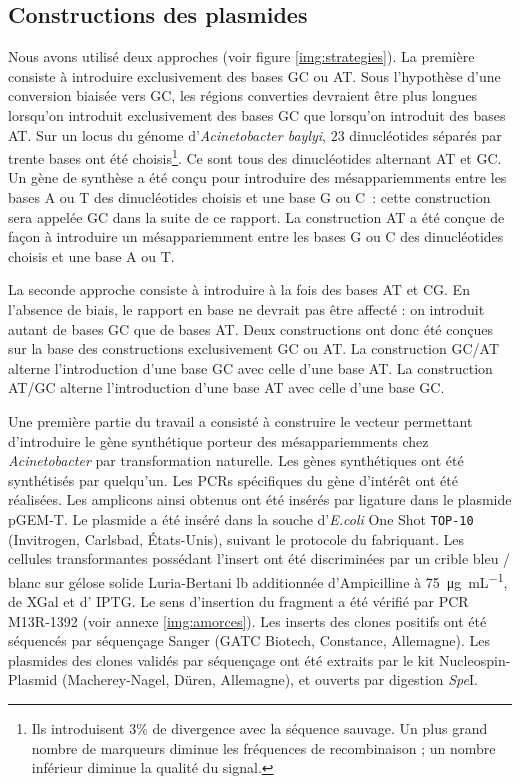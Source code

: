 \subsection{Constructions des plasmides}
\label{subsec:constructions}

Nous avons utilisé deux approches (voir figure \ref{img:strategies}). La
première consiste à introduire exclusivement des bases GC ou AT. Sous
l'hypothèse d'une conversion biaisée vers GC, les régions converties devraient
être plus longues lorsqu'on introduit exclusivement des bases GC que lorsqu'on
introduit des bases AT. Sur un locus du génome d'\emph{Acinetobacter baylyi},
$23$ dinucléotides séparés par trente bases ont été choisis\footnote{Ils
  introduisent 3\% de divergence avec la séquence sauvage. Un plus grand nombre
  de marqueurs diminue les fréquences de recombinaison ; un nombre inférieur
  diminue la qualité du signal.}. Ce sont tous des dinucléotides alternant AT et
GC. Un gène de synthèse a été conçu pour introduire des mésappariemments entre
les bases A ou T des dinucléotides choisis et une base G ou C~: cette
construction sera appelée GC dans la suite de ce rapport. La construction AT a
été conçue de façon à introduire un mésappariemment entre les bases G ou C des
dinucléotides choisis et une base A ou T.


La seconde approche consiste à introduire à la fois des bases AT et CG. En
l'absence de biais, le rapport en base ne devrait pas être affecté : on
introduit autant de bases GC que de bases AT. Deux constructions ont donc été
conçues sur la base des constructions exclusivement GC ou AT. La construction
GC/AT alterne l'introduction d'une base GC avec celle d'une base AT. La
construction AT/GC alterne l'introduction d'une base AT avec celle d'une base
GC.

Une première partie du travail a consisté à construire le vecteur permettant
d'introduire le gène synthétique porteur des mésappariemments chez
\emph{Acinetobacter} par transformation naturelle. Les gènes synthétiques ont
été synthétisés par quelqu'un.
Les PCRs spécifiques du gène d'intérêt ont été réalisées. Les amplicons ainsi
obtenus ont été insérés par ligature dans le plasmide pGEM-T. Le plasmide a été
inséré dans la souche d'\textit{E.coli} One
Shot\textsuperscript{{\textregistered}} \texttt{TOP-10} (Invitrogen, Carlsbad,
États-Unis), suivant le protocole du fabriquant. Les cellules transformantes
possédant l'insert ont été discriminées par un crible bleu / blanc sur gélose
solide Luria-Bertani \ac{lb} additionnée d'Ampicilline à \SI{75}{\ug\per\mL}, de
XGal et d' IPTG. Le sens d'insertion du fragment a été vérifié par PCR M13R-1392
(voir annexe \ref{img:amorces}). Les inserts des clones positifs ont été
séquencés par séquençage Sanger (GATC Biotech, Constance, Allemagne). Les
plasmides des clones validés par séquençage ont été extraits par le kit
Nucleospin-Plasmid (Macherey-Nagel, Düren, Allemagne), et ouverts par digestion
\emph{Spe}I.

